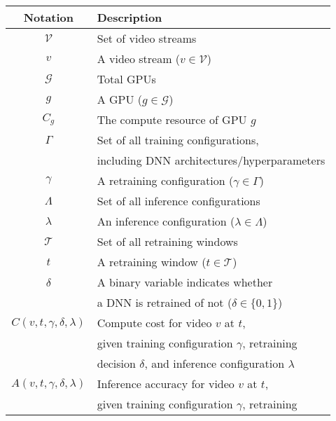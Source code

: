 \begin{table}[t!]
\small
\begin{tabular}{cl}
{\bf Notation} & {\bf Description}\\\hline
$\mathcal{V}$ & Set of video streams\\
$v$ & A video stream ($v \in \mathcal{V}$)\\\hline
$\mathcal{G}$ & Total GPUs\\
$g$ & A GPU ($g \in \mathcal{G}$)\\
$C_g$ & The compute resource of GPU $g$\\\hline
$\Gamma$ & Set of all training configurations, \\
 & including DNN architectures/hyperparameters\\
$\gamma$ & A retraining configuration ($\gamma \in \Gamma$)\\
$\Lambda$ & Set of all inference configurations\\
$\lambda$ & An inference configuration ($\lambda \in \Lambda$)\\\hline
$\mathcal{T}$ & Set of all retraining windows\\
$t$ & A retraining window ($t \in \mathcal{T}$)\\\hline
$\delta$ & A binary variable indicates whether \\
         & a DNN is retrained of not ($\delta\in\{0,1\}$)\\\hline
$C(v, t, \gamma, \delta, \lambda)$ & Compute cost for video $v$ at $t$, \\
                                   & given training configuration $\gamma$, retraining  \\
                                   & decision $\delta$, and inference configuration $\lambda$ \\
$A(v, t, \gamma, \delta, \lambda)$ & Inference accuracy for video $v$ at $t$, \\
                                   & given training configuration $\gamma$, retraining  \\

\end{tabular}
\end{table}
